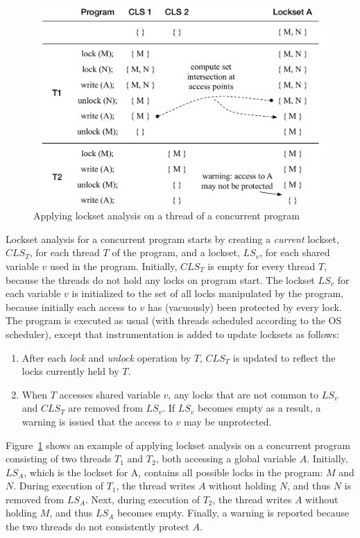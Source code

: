 \begin{figure}[htbp]
\centering
\includegraphics[width=1\linewidth]{img/lockset.pdf}
\caption{Applying lockset analysis on a thread of a concurrent program}
\label{fig:locksets}
\end{figure}

Lockset analysis for a concurrent program starts by creating a \emph{current} lockset, $\mathit{CLS}_T$, for each thread $T$ of the program, and a lockset, $\mathit{LS}_v$, for each shared variable $v$ used in the program. Initially, $\mathit{CLS}_T$ is empty for every thread $T$, because the threads do not hold any locks on program start. The lockset $\mathit{LS}_v$ for each variable $v$ is initialized to the set of all locks manipulated by the program, because initially each access to $v$ has (vacuously) been protected by every lock. The program is executed as usual (with threads scheduled according to the OS scheduler), except that instrumentation is added to update locksets as follows:
%
\begin{enumerate}
\item After each \emph{lock} and \emph{unlock} operation by $T$, $\mathit{CLS}_T$ is updated to reflect the locks currently held by $T$.
\item When $T$ accesses shared variable $v$, any locks that are not common to $\mathit{LS}_v$ and $\mathit{CLS}_T$ are removed from $\mathit{LS}_v$.
If $\mathit{LS}_v$ becomes empty as a result, a warning is issued that the access to $v$ may be unprotected.
\end{enumerate}

Figure~\ref{fig:locksets} shows an example of applying lockset analysis on a concurrent program consisting of two threads $T_1$ and $T_2$, both accessing a global variable $A$. Initially, $\mathit{LS}_A$, which is the lockset for A, contains all possible locks in the program: $M$ and $N$. During execution of $T_1$, the thread writes $A$ without holding $N$, and thus $N$ is removed from $\mathit{LS}_A$. Next, during execution of $T_2$, the thread writes $A$ without holding $M$, and thus $\mathit{LS}_A$ becomes empty. Finally, a warning is reported because the two threads do not consistently protect $A$.

